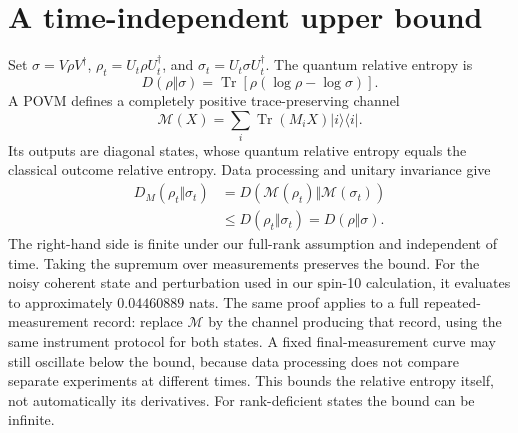\documentclass[11pt,a4paper]{article}
\newcommand{\Tr}{\operatorname{Tr}}
\begin{document}
\section{A time-independent upper bound}
Set $\sigma=V\rho V^\dagger$, $\rho_t=U_t\rho U_t^\dagger$, and $\sigma_t=U_t\sigma U_t^\dagger$. The quantum relative entropy is
\[D(\rho\Vert\sigma)=\Tr[\rho(\log\rho-\log\sigma)].\]
A POVM defines a completely positive trace-preserving channel
\[\mathcal M(X)=\sum_i\Tr(M_iX)|i\rangle\langle i|.\]
Its outputs are diagonal states, whose quantum relative entropy equals the classical outcome relative entropy. Data processing and unitary invariance give
\[\begin{aligned}D_M(\rho_t\Vert\sigma_t)&=D(\mathcal M(\rho_t)\Vert\mathcal M(\sigma_t))\\&\leq D(\rho_t\Vert\sigma_t)=D(\rho\Vert\sigma).\end{aligned}\]
The right-hand side is finite under our full-rank assumption and independent of time. Taking the supremum over measurements preserves the bound. For the noisy coherent state and perturbation used in our spin-10 calculation, it evaluates to approximately $0.04460889$ nats.
The same proof applies to a full repeated-measurement record: replace $\mathcal M$ by the channel producing that record, using the same instrument protocol for both states. A fixed final-measurement curve may still oscillate below the bound, because data processing does not compare separate experiments at different times. This bounds the relative entropy itself, not automatically its derivatives. For rank-deficient states the bound can be infinite.
\end{document}
